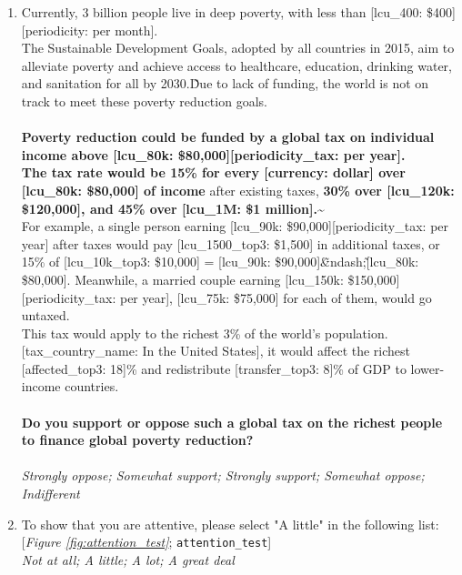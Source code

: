 \begin{enumerate}[resume]
\item  \label{q:top3_tax_support} Currently, 3 billion people live in deep poverty, with less than [lcu\_400: \$400][periodicity: per month].\\The Sustainable Development Goals, adopted by all countries in 2015, aim to alleviate poverty and achieve access to healthcare, education, drinking water, and sanitation for all by 2030.\~Due to lack of funding, the world is not on track to meet these poverty reduction goals.\\\\\textbf{Poverty reduction could be funded by a global tax on individual income above [lcu\_80k: \$80,000][periodicity\_tax: per year].\~\\The tax rate would be 15\% for every [currency: dollar] over [lcu\_80k: \$80,000] of income} after existing taxes, \textbf{30\% over [lcu\_120k: \$120,000], and 45\% over [lcu\_1M: \$1 million].\~}\\For example, a single person earning [lcu\_90k: \$90,000][periodicity\_tax: per year] after taxes would pay [lcu\_1500\_top3: \$1,500] in additional taxes, or 15\% of [lcu\_10k\_top3: \$10,000] = [lcu\_90k: \$90,000]\~\&ndash;\~[lcu\_80k: \$80,000]. Meanwhile, a married couple earning [lcu\_150k: \$150,000][periodicity\_tax: per year], [lcu\_75k: \$75,000] for each of them, would go untaxed.\\This tax would apply to the richest 3\% of the world's population. [tax\_country\_name: In the United States], it would affect the richest [affected\_top3: 18]\% and redistribute [transfer\_top3: 8]\% of GDP to lower-income countries.\\\\\textbf{Do you support or oppose such a global tax on the richest people to finance global poverty reduction?}\\ [\textit{Figure \ref{fig:top3_tax_support}}; 
\verb|top3_tax_support|]
  \\ \textit{Strongly oppose; Somewhat support; Strongly support; Somewhat oppose; Indifferent}

\item  \label{q:attention_test} To show that you are attentive, please select "A little" in the following list: [\textit{Figure \ref{fig:attention_test}}; 
\verb|attention_test|]
  \\ \textit{Not at all; A little; A lot; A great deal}

\end{enumerate} 

